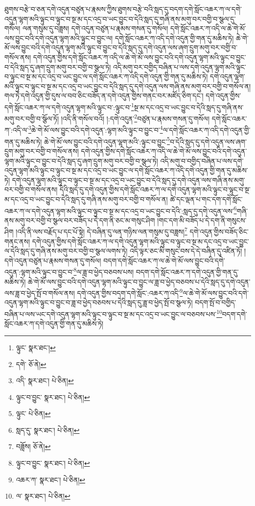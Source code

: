 ཐུགས་བརྩེ་བ་ཅན་དགེ་འདུན་བཙུན་པ་རྣམས་ཀྱིས་ཐུགས་བརྩེ་བའི་སླད་དུ་བདག་དགེ་སློང་འཆར་ཀ་ལ་དགེ་འདུན་ལྷག་མའི་ལྟུང་བ་ལྟུང་བ་སྔ་མ་དང་འདྲ་བ་ཡང་བྱུང་བ་དེའི་སླད་དུ་གཞི་ནས་མགུ་བར་བགྱི་བ་སྩལ་དུ་གསོལ། ལན་གསུམ་དུ་བཟླས། དགེ་འདུན་བཙུན་པ་རྣམས་གསན་དུ་གསོལ། དགེ་སློང་འཆར་ཀ་འདི་ལ་ཆེ་གེ་མོ་ལས་བྱུང་བའི་དགེ་འདུན་ལྷག་མའི་ལྟུང་བ་བྱུང་ལ། དགེ་སློང་འཆར་ཀ་འདི་དགེ་འདུན་གྱི་གན་དུ་མཆིས་ཏེ། ཆེ་གེ་མོ་ལས་བྱུང་བའི་དགེ་འདུན་ལྷག་མའི་ལྟུང་བ་བྱུང་བ་དེའི་སླད་དུ་དགེ་འདུན་ལས་ཞག་དྲུག་མགུ་བར་བགྱི་བ་གསོལ་ནས། དགེ་འདུན་གྱིས་དགེ་སློང་འཆར་ཀ་འདི་ལ་ཆེ་གེ་མོ་ལས་བྱུང་བའི་དགེ་འདུན་ལྷག་མའི་ལྟུང་བ་བྱུང་བ་དེའི་སླད་དུ་ཞག་དྲུག་མགུ་བར་བགྱི་བ་སྩལ་ཏེ། འདི་མགུ་བར་བགྱིད་བཞིན་པ་ལས་དགེ་འདུན་ལྷག་མའི་ལྟུང་བ་ལྟུང་བ་སྔ་མ་དང་འདྲ་བ་ཡང་བྱུང་ལ་དགེ་སློང་འཆར་ཀ་འདི་དགེ་འདུན་གྱི་གན་དུ་མཆིས་ཏེ། དགེ་འདུན་ལྷག་མའི་ལྟུང་བ་ལྟུང་བ་སྔ་མ་དང་འདྲ་བ་ཡང་བྱུང་བ་དེའི་སླད་དུ་དགེ་འདུན་ལས་གཞི་ནས་མགུ་བར་བགྱི་བ་གསོལ་ན། གལ་ཏེ་དགེ་འདུན་གྱི་དུས་ལ་བབ་ཅིང་བཟོད་ན་དགེ་འདུན་གྱིས་གནང་བར་མཛོད་ཅིག་དང་། དགེ་འདུན་གྱིས་དགེ་སློང་འཆར་ཀ་ལ་དགེ་འདུན་ལྷག་མའི་ལྟུང་བ་:ལྟུང་བ་\footnote{ལྟུང་  སྣར་ཐང་། }སྔ་མ་དང་འདྲ་བ་ཡང་བྱུང་བ་དེའི་སླད་དུ་གཞི་ནས་མགུ་བར་བགྱི་བ་སྩོལ་ཏོ། །འདི་ནི་གསོལ་བའོ། །:དགེ་འདུན་\footnote{དགེ་  ཅོ་ནེ། }བཙུན་པ་རྣམས་གསན་དུ་གསོལ། དགེ་སློང་འཆར་ཀ་:འདི་ལ་\footnote{འདི་  སྣར་ཐང་།  པེ་ཅིན། }ཆེ་གེ་མོ་ལས་བྱུང་བའི་དགེ་འདུན་:ལྷག་མའི་ལྟུང་བ་བྱུང་བ་\footnote{ལྟུང་བ་བྱུང་  སྣར་ཐང་།  པེ་ཅིན། }ལ་དགེ་སློང་འཆར་ཀ་འདི་དགེ་འདུན་གྱི་གན་དུ་མཆིས་ཏེ། ཆེ་གེ་མོ་ལས་བྱུང་བའི་དགེ་འདུན་ལྷག་མའི་:ལྟུང་བ་བྱུང་\footnote{ལྟུང་  པེ་ཅིན། }བ་དེའི་སླད་དུ་དགེ་འདུན་ལས་ཞག་དྲུག་མགུ་བར་བགྱི་བ་གསོལ་ནས། དགེ་འདུན་གྱིས་དགེ་སློང་འཆར་ཀ་འདི་ལ་ཆེ་གེ་མོ་ལས་བྱུང་བའི་དགེ་འདུན་ལྷག་མའི་ལྟུང་བ་བྱུང་བ་དེའི་སླད་དུ་ཞག་དྲུག་མགུ་བར་བགྱི་བ་སྩལ་ཏེ། འདི་མགུ་བ་བགྱིད་བཞིན་པ་ལས་དགེ་འདུན་ལྷག་མའི་ལྟུང་བ་ལྟུང་བ་སྔ་མ་དང་འདྲ་བ་ཡང་བྱུང་ལ་དགེ་སློང་འཆར་ཀ་འདི་དགེ་འདུན་གྱི་གན་དུ་མཆིས་ཏེ། དགེ་འདུན་ལྷག་མའི་ལྟུང་བ་ལྟུང་བ་སྔ་མ་དང་འདྲ་བ་ཡང་བྱུང་བ་དེའི་སླད་དུ་དགེ་འདུན་ལས་གཞི་ནས་མགུ་བར་བགྱི་བ་གསོལ་ནས། དེའི་སླད་དུ་དགེ་འདུན་གྱིས་དགེ་སློང་འཆར་ཀ་ལ་དགེ་འདུན་ལྷག་མའི་ལྟུང་བ་ལྟུང་བ་སྔ་མ་དང་འདྲ་བ་ཡང་བྱུང་བ་དེའི་སླད་དུ་གཞི་ནས་མགུ་བར་བགྱི་བ་གསོལ་ན། ཚེ་དང་ལྡན་པ་གང་དག་དགེ་སློང་འཆར་ཀ་ལ་དགེ་འདུན་ལྷག་མའི་ལྟུང་བ་ལྟུང་བ་སྔ་མ་དང་འདྲ་བ་ཡང་བྱུང་བ་དེའི་:སླད་དུ་དགེ་འདུན་ལས་\footnote{སླད་དུ་  སྣར་ཐང་།  པེ་ཅིན། }གཞི་ནས་མགུ་བར་བགྱི་བ་སྩལ་བར་བཟོད་པ་དེ་དག་ནི་ཅང་མ་གསུང་ཤིག །གང་དག་མི་བཟོད་པ་དེ་དག་ནི་གསུངས་ཤིག །འདི་ནི་ལས་བརྗོད་པ་དང་པོ་སྟེ། དེ་བཞིན་དུ་ལན་གཉིས་ལན་གསུམ་དུ་བཟླས།\footnote{བཟློས།  ཅོ་ནེ། } དགེ་འདུན་གྱིས་བཟོད་ཅིང་གནང་ནས། དགེ་འདུན་གྱིས་དགེ་སློང་འཆར་ཀ་ལ་དགེ་འདུན་ལྷག་མའི་ལྟུང་བ་ལྟུང་བ་སྔ་མ་དང་འདྲ་བ་ཡང་བྱུང་ལ་དེའི་སླད་དུ་གཞི་ནས་མགུ་བར་བགྱི་བ་སྩལ་ལགས་ཏེ། འདི་ལྟར་ཅང་མི་གསུང་བས་དེ་དེ་བཞིན་དུ་འཛིན་ཏོ། །དགེ་འདུན་བཙུན་པ་རྣམས་གསན་དུ་གསོལ། བདག་དགེ་སློང་འཆར་ཀ་ལ་ཆེ་གེ་མོ་ལས་བྱུང་བའི་དགེ་འདུན་:ལྷག་མའི་ལྟུང་བ་བྱུང་བ་\footnote{ལྟུང་བ་བྱུང་  སྣར་ཐང་།  པེ་ཅིན། }ལ་ཟླ་བ་ཕྱེད་བཅབས་པས། བདག་དགེ་སློང་འཆར་ཀ་དགེ་འདུན་གྱི་གན་དུ་མཆིས་ཏེ། ཆེ་གེ་མོ་ལས་བྱུང་བའི་དགེ་འདུན་ལྷག་མའི་ལྟུང་བ་བྱུང་ལ་ཟླ་བ་ཕྱེད་བཅབས་པ་དེའི་སླད་དུ་དགེ་འདུན་ལས་ཟླ་བ་ཕྱེད་སྤོ་བ་གསོལ་ནས། དགེ་འདུན་གྱིས་བདག་དགེ་སློང་:འཆར་ཀ་འདི་\footnote{འཆར་ཀ་  སྣར་ཐང་།  པེ་ཅིན། }ལ་ཆེ་གེ་མོ་ལས་བྱུང་བའི་དགེ་འདུན་ལྷག་མའི་ལྟུང་བ་བྱུང་བ་ཟླ་བ་ཕྱེད་བཅབས་པ་དེའི་སླད་དུ་ཟླ་བ་ཕྱེད་སྤོ་བ་སྩལ་ཏེ། བདག་སྤོ་བ་བགྱིད་བཞིན་པ་ལས་ཡང་དགེ་འདུན་ལྷག་མའི་ལྟུང་བ་ལྟུང་བ་སྔ་མ་དང་འདྲ་བ་ཡང་བྱུང་ལ་བཅབས་པས་\footnote{ལ་  སྣར་ཐང་།  པེ་ཅིན། }བདག་དགེ་སློང་འཆར་ཀ་དགེ་འདུན་གྱི་གན་དུ་མཆིས་ཏེ། 